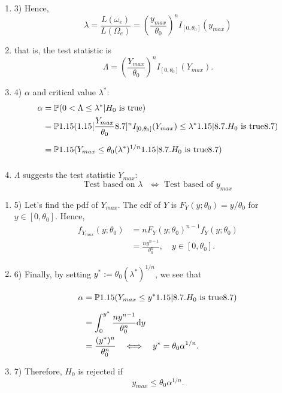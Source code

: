 \begin{frame}

	\begin{enumerate}
	\item[]	3) Hence,
		\[
			\lambda =
			\frac{L(\omega_e)}{L(\Omega_e)} =
			\left(\frac{y_{max}}{\theta_0}\right)^nI_{[0,\theta_0]}(y_{max})
		\]
	\item[] that is, the test statistic is
			\[
				\Lambda = \left(\frac{Y_{max}}{\theta_0}\right)^n I_{[0,\theta_0]}(Y_{max}).
			\]
			\vfill
	\item[] 4) $\alpha$ and critical value $\lambda^*$:
\begin{align*}
			\alpha & =
			\bbP(0<\Lambda\le \lambda^*| \text{$H_0$ is true})
			\\&=
			\bbP\left(\left[\frac{Y_{max}}{\theta_0}\right]^n I_{[0,\theta_0]}(Y_{max}) \le \lambda^*\bigg| \text{$H_0$ is true}\right)
			\\&=
			\bbP\left(Y_{max}  \le\theta_0 (\lambda^*)^{1/n}\bigg| \text{$H_0$ is true}\right)
		\end{align*}
		\vfill
	\item[] \hspace{2em} $\Lambda$ suggests the test statistic $Y_{max}$:\\[0.5em]
		\[\text{Test based on $\lambda$ $\Longleftrightarrow$ Test based of $y_{max}$}\]
	\end{enumerate}
\end{frame}
\begin{frame}
	\begin{enumerate}
		\item[] 5) Let's find the pdf of $Y_{max}$. The cdf of $Y$ is $F_Y(y;\theta_0) = y/\theta_0$ for $y\in [0,\theta_0]$. Hence,
			\begin{align*}
				f_{Y_{max}}(y;\theta_0)
				&=n F_Y(y;\theta_0)^{n-1}f_Y(y;\theta_0)\\
				&= \frac{n y^{n-1}}{\theta_0^n},\quad y\in [0,\theta_0].
			\end{align*}
			\vfill
		\item[] 6) Finally, by setting $y^*:= \theta_0(\lambda^*)^{1/n}$, we see that
			\begin{align*}
				\alpha&=
				\bbP\left(Y_{max}  \le y^* \bigg| \text{$H_0$ is true}\right)
				    \\&= \int_0^{y^*} \frac{ny^{n-1}}{\theta_0^n} \ud y
				    \\&= \frac{(y^*)^n}{\theta_0^n} \quad\Longleftrightarrow\quad
				    y^* = \theta_0 \alpha^{1/n}.
			\end{align*}
			\vfill
		\item[]	7) Therefore, $H_0$ is rejected if
			\[
				y_{max}\le  \theta_0 \alpha^{1/n}.
			\]
			\myEnd
	\end{enumerate}
\end{frame}
